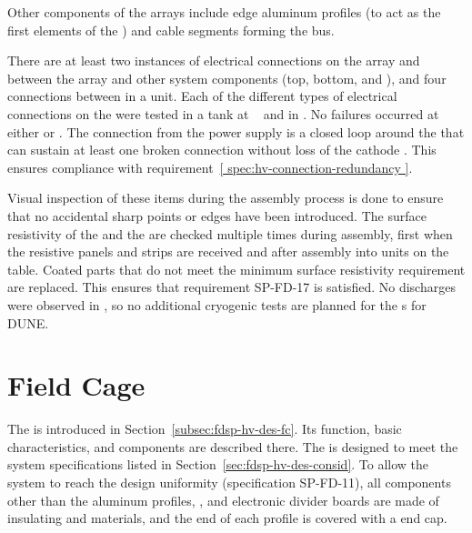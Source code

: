 Other  components of the  arrays include  edge aluminum profiles (to act as the first elements of the ) and cable segments forming the  bus. 

There are at least two instances of electrical connections on the  array and between the  array and other  system components (top, bottom, and ), and four connections between  in a  unit.  Each of the different types of electrical connections on the  were tested in a  tank at ~\cite{bib:docdb2338}  and in . %
No failures occurred at either  or . The  connection from the  power supply is a closed loop around the  that can sustain at least one broken connection without loss of the cathode .  This ensures compliance with requirement~\ref{ spec:hv-connection-redundancy }.

Visual inspection of these items during the assembly process is done to ensure that no accidental sharp points or edges have been introduced. The surface resistivity of the   and the  are checked multiple times during assembly, first when the resistive panels and strips are received and after assembly into  units on the table.  Coated parts that do not meet the minimum surface resistivity requirement are replaced.  This ensures that requirement SP-FD-17 is satisfied. No discharges were observed in , so no additional cryogenic tests are planned for the s for DUNE. 



\section{Field Cage}
\label{sec:fdsp-hv-des-fc}


The  is introduced in Section~\ref{subsec:fdsp-hv-des-fc}. Its function, basic characteristics, and components are described there. 
The  %
is designed to %
meet the system specifications listed in Section~\ref{sec:fdsp-hv-des-consid}. %
To allow the system to reach the design \efield{} uniformity 
(specification SP-FD-11), 
all components other than the aluminum profiles, , and electronic divider boards are made of insulating  and \frfour materials, and the end of each profile is covered with a  end cap. \\

